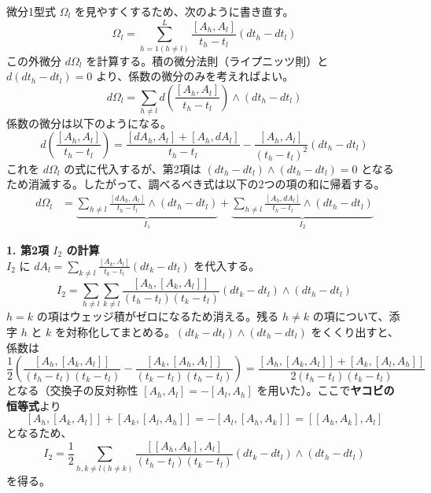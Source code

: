 微分1型式 $\Omega_l$ を見やすくするため、次のように書き直す。
\[
  \Omega_l = \sum_{h=1 (h \neq l)}^L \frac{[A_h, A_l]}{t_h - t_l} (dt_h - dt_l)
\]
この外微分 $d\Omega_l$ を計算する。積の微分法則（ライプニッツ則）と $d(dt_h - dt_l) = 0$ より、係数の微分のみを考えればよい。
\[
  d\Omega_l = \sum_{h \neq l} d\left( \frac{[A_h, A_l]}{t_h - t_l} \right) \wedge (dt_h - dt_l)
\]
係数の微分は以下のようになる。
\[
  d\left( \frac{[A_h, A_l]}{t_h - t_l} \right) = \frac{[dA_h, A_l] + [A_h, dA_l]}{t_h - t_l} - \frac{[A_h, A_l]}{(t_h - t_l)^2}(dt_h - dt_l)
\]
これを $d\Omega_l$ の式に代入するが、第2項は $(dt_h - dt_l) \wedge (dt_h - dt_l) = 0$ となるため消滅する。したがって、調べるべき式は以下の2つの項の和に帰着する。
\begin{align*}
  d\Omega_l &= \underbrace{ \sum_{h \neq l} \frac{[dA_h, A_l]}{t_h - t_l} \wedge (dt_h - dt_l) }_{I_1} + \underbrace{ \sum_{h \neq l} \frac{[A_h, dA_l]}{t_h - t_l} \wedge (dt_h - dt_l) }_{I_2}
\end{align*}

\textbf{1. 第2項 $I_2$ の計算} \\
$I_2$ に $dA_l = \sum_{k \neq l} \frac{[A_k, A_l]}{t_k - t_l}(dt_k - dt_l)$ を代入する。
\[
  I_2 = \sum_{h \neq l} \sum_{k \neq l} \frac{[A_h, [A_k, A_l]]}{(t_h - t_l)(t_k - t_l)} (dt_k - dt_l) \wedge (dt_h - dt_l)
\]
$h=k$ の項はウェッジ積がゼロになるため消える。残る $h \neq k$ の項について、添字 $h$ と $k$ を対称化してまとめる。$(dt_k - dt_l) \wedge (dt_h - dt_l)$ をくくり出すと、係数は
\[
  \frac{1}{2} \left( \frac{[A_h, [A_k, A_l]]}{(t_h - t_l)(t_k - t_l)} - \frac{[A_k, [A_h, A_l]]}{(t_k - t_l)(t_h - t_l)} \right) = \frac{ [A_h, [A_k, A_l]] + [A_k, [A_l, A_h]] }{2(t_h - t_l)(t_k - t_l)}
\]
となる（交換子の反対称性 $[A_h, A_l] = -[A_l, A_h]$ を用いた）。ここで\textbf{ヤコビの恒等式}より
\[
  [A_h, [A_k, A_l]] + [A_k, [A_l, A_h]] = -[A_l, [A_h, A_k]] = [[A_h, A_k], A_l]
\]
となるため、
\begin{equation}
  I_2 = \frac{1}{2} \sum_{h, k \neq l (h \neq k)} \frac{[[A_h, A_k], A_l]}{(t_h - t_l)(t_k - t_l)} (dt_k - dt_l) \wedge (dt_h - dt_l)
  \label{eq:3.4_I2_result}
\end{equation}
を得る。

